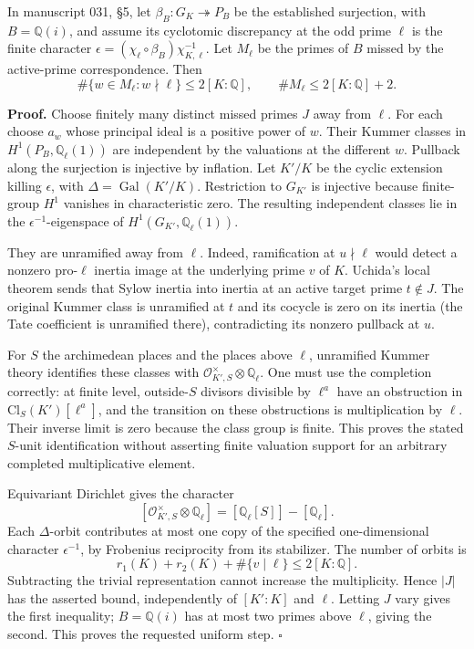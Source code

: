 \documentclass[10pt,a4paper]{article}
\begin{document}
\nopagebreak[4]

In manuscript 031, \S{}5, let \(\beta_B:G_K\twoheadrightarrow P_B\) be the established surjection, with \(B=\mathbb Q(i)\), and assume its cyclotomic discrepancy at the odd prime \(\ell\) is the finite character \(\epsilon=(\chi_\ell\circ\beta_B)\chi_{K,\ell}^{-1}\). Let \(M_\ell\) be the primes of \(B\) missed by the active-prime correspondence. Then \[
 \#\{w\in M_\ell:w\nmid\ell\}\leq2[K:\mathbb Q],
 \qquad \#M_\ell\leq2[K:\mathbb Q]+2.
\]

\textbf{Proof.} Choose finitely many distinct missed primes \(J\) away from \(\ell\). For each choose \(a_w\) whose principal ideal is a positive power of \(w\). Their Kummer classes in \(H^1(P_B,\mathbb Q_\ell(1))\) are independent by the valuations at the different \(w\). Pullback along the surjection is injective by inflation. Let \(K'/K\) be the cyclic extension killing \(\epsilon\), with \(\Delta=\operatorname{Gal}(K'/K)\). Restriction to \(G_{K'}\) is injective because finite-group \(H^1\) vanishes in characteristic zero. The resulting independent classes lie in the \(\epsilon^{-1}\)-eigenspace of \(H^1(G_{K'},\mathbb Q_\ell(1))\).

They are unramified away from \(\ell\). Indeed, ramification at \(u\nmid\ell\) would detect a nonzero pro-\(\ell\) inertia image at the underlying prime \(v\) of \(K\). Uchida's local theorem sends that Sylow inertia into inertia at an active target prime \(t\notin J\). The original Kummer class is unramified at \(t\) and its cocycle is zero on its inertia (the Tate coefficient is unramified there), contradicting its nonzero pullback at \(u\).

For \(S\) the archimedean places and the places above \(\ell\), unramified Kummer theory identifies these classes with \(\mathcal O_{K',S}^{\times}\otimes\mathbb Q_\ell\). One must use the completion correctly: at finite level, outside-\(S\) divisors divisible by \(\ell^a\) have an obstruction in \(\mathrm{Cl}_S(K')[\ell^a]\), and the transition on these obstructions is multiplication by \(\ell\). Their inverse limit is zero because the class group is finite. This proves the stated \(S\)-unit identification without asserting finite valuation support for an arbitrary completed multiplicative element.

Equivariant Dirichlet gives the character \[
 [\mathcal O_{K',S}^{\times}\otimes\mathbb Q_\ell]
 =[\mathbb Q_\ell[S]]-[\mathbb Q_\ell].
\] Each \(\Delta\)-orbit contributes at most one copy of the specified one-dimensional character \(\epsilon^{-1}\), by Frobenius reciprocity from its stabilizer. The number of orbits is \[
 r_1(K)+r_2(K)+\#\{v\mid\ell\}\leq2[K:\mathbb Q].
\] Subtracting the trivial representation cannot increase the multiplicity. Hence \(|J|\) has the asserted bound, independently of \([K':K]\) and \(\ell\). Letting \(J\) vary gives the first inequality; \(B=\mathbb Q(i)\) has at most two primes above \(\ell\), giving the second. This proves the requested uniform step. \(\square\)
\end{document}
